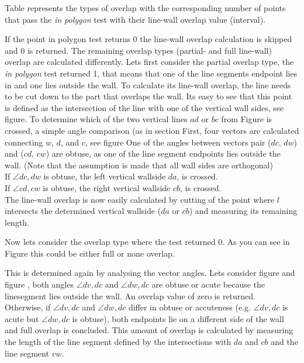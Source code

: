 \documentclass[10pt]{article}
\begin{document}
	Table %
	represents the types of overlap with the corresponding number of points
	that pass the \emph{in polygon} test with their line-wall overlap value (interval).

	If the point in polygon test returns 0 the line-wall overlap calculation
	is skipped and 0 is returned. The remaining overlap types (partial- and full
	line-wall) overlap are calculated differently.
	Lets first consider the partial overlap type, the \emph{in polygon} test
	returned 1, that means that one of the line segments endpoint lies in
	and one lies outside the wall.
	To calculate its line-wall overlap, the line needs to be cut down to the
	part that overlaps the wall. Its easy to see that this point is defined
	as the intersection of the line with one of the vertical wall sides, see
	figure. %
	To determine which of the two vertical lines $ad$ or $bc$ from Figure
	 is crossed, a simple angle comparison (as in section %
	First, four vectors are calculated connecting $w$, $d$, and $c$, see figure %
	One of the angles between vectors pair ($dc$, $dw$) and ($cd$, $cw$) are
	obtuse, as one of the line segment endpoints lies outside the wall. 
	(Note that the assumption is made that all wall sides are orthogonal)\\
	If $\angle dc, dw$ is obtuse, the left vertical wallside $da$, is
	crossed. \\
	If $\angle cd, cw$ is obtuse, the right vertical wallside $cb$, is
	crossed. \\
	The line-wall overlap is now easily calculated by cutting of the
	point where $l$ intersects the determined vertical wallside ($da$ or
	$cb$) and measuring its remaining length.


	Now lets consider the overlap type where the  test
	returned 0.
	As you can see in Figure %
	this could be either full or none overlap.

	This is determined again by analysing the vector angles.
	Lets consider 
	figure %
	and figure %
	, both angles $\angle dv, dc$ and $\angle dw,dc$ are obtuse or acute
	because the linesegment lies outside the wall. An overlap value of zero
	is returned.\\
	Otherwise, if $\angle dv, dc$ and $\angle dw,dc$ differ in obtuse or accuteness
	(e.g. $\angle dv, dc$ is acute but $\angle dw, dc$ is obtuse), 
	both endpoints lie on a different side of the wall and full overlap is
	concluded. This amount of overlap is calculated by measuring the length
	of the line segment defined by the intersections with $da$ and $cb$ and
	the line segment $vw$.
	
\end{document}
